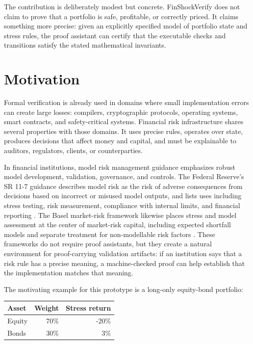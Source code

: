 \documentclass[11pt]{article}
\begin{document}
The contribution is deliberately modest but concrete. FinShockVerify does not
claim to prove that a portfolio is safe, profitable, or correctly priced. It
claims something more precise: given an explicitly specified model of portfolio
state and stress rules, the proof assistant can certify that the executable
checks and transitions satisfy the stated mathematical invariants.

\section{Motivation}

Formal verification is already used in domains where small implementation
errors can create large losses: compilers, cryptographic protocols, operating
systems, smart contracts, and safety-critical systems. Financial risk
infrastructure shares several properties with those domains. It uses precise
rules, operates over state, produces decisions that affect money and capital,
and must be explainable to auditors, regulators, clients, or counterparties.

In financial institutions, model risk management guidance emphasizes robust
model development, validation, governance, and controls. The Federal Reserve's
SR 11-7 guidance describes model risk as the risk of adverse consequences from
decisions based on incorrect or misused model outputs, and lists uses including
stress testing, risk measurement, compliance with internal limits, and financial
reporting \cite{fed2011sr117}. The Basel market-risk framework likewise places
stress and model assessment at the center of market-risk capital, including
expected shortfall models and separate treatment for non-modellable risk
factors \cite{basel2019marketrisk}. These frameworks do not require proof
assistants, but they create a natural environment for proof-carrying
validation artifacts: if an institution says that a risk rule has a precise
meaning, a machine-checked proof can help establish that the implementation
matches that meaning.

The motivating example for this prototype is a long-only equity-bond portfolio:

\begin{center}
\begin{tabular}{lrr}
\toprule
Asset & Weight & Stress return \\
\midrule
Equity & 70\% & -20\% \\
Bonds & 30\% & 3\% \\
\bottomrule
\end{tabular}
\end{center}
\end{document}
